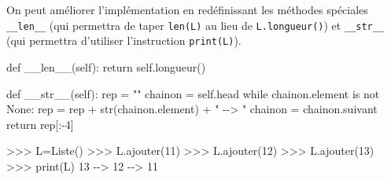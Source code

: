 \documentclass[
  a4paper,
  DIV=11,
  numbers=noendperiod]{scrartcl}
\newenvironment{Shaded}{\begin{snugshade}}{\end{snugshade}}
\newcommand{\BuiltInTok}[1]{\textcolor[rgb]{0.00,0.23,0.31}{#1}}
\newcommand{\ControlFlowTok}[1]{\textcolor[rgb]{0.00,0.23,0.31}{#1}}
\newcommand{\DecValTok}[1]{\textcolor[rgb]{0.68,0.00,0.00}{#1}}
\newcommand{\FunctionTok}[1]{\textcolor[rgb]{0.28,0.35,0.67}{#1}}
\newcommand{\KeywordTok}[1]{\textcolor[rgb]{0.00,0.23,0.31}{#1}}
\newcommand{\NormalTok}[1]{\textcolor[rgb]{0.00,0.23,0.31}{#1}}
\newcommand{\OperatorTok}[1]{\textcolor[rgb]{0.37,0.37,0.37}{#1}}
\newcommand{\StringTok}[1]{\textcolor[rgb]{0.13,0.47,0.30}{#1}}
\newcommand{\VariableTok}[1]{\textcolor[rgb]{0.07,0.07,0.07}{#1}}
\begin{document}
On peut améliorer l'implémentation en redéfinissant les méthodes
spéciales \texttt{\_\_len\_\_} (qui permettra de taper \texttt{len(L)}
au lieu de \texttt{L.longueur()}) et \texttt{\_\_str\_\_} (qui permettra
d'utiliser l'instruction \texttt{print(L)}).

\begin{Shaded}
\begin{Highlighting}[]
    \KeywordTok{def} \FunctionTok{\_\_len\_\_}\NormalTok{(}\VariableTok{self}\NormalTok{):}
        \ControlFlowTok{return} \VariableTok{self}\NormalTok{.longueur()}

    \KeywordTok{def} \FunctionTok{\_\_str\_\_}\NormalTok{(}\VariableTok{self}\NormalTok{):}
\NormalTok{        rep }\OperatorTok{=} \StringTok{""}
\NormalTok{        chainon }\OperatorTok{=} \VariableTok{self}\NormalTok{.head}
        \ControlFlowTok{while}\NormalTok{ chainon.element }\KeywordTok{is} \KeywordTok{not} \VariableTok{None}\NormalTok{:}
\NormalTok{            rep }\OperatorTok{=}\NormalTok{ rep }\OperatorTok{+} \BuiltInTok{str}\NormalTok{(chainon.element) }\OperatorTok{+} \StringTok{" {-}{-}\textgreater{} "}
\NormalTok{            chainon }\OperatorTok{=}\NormalTok{ chainon.suivant}
        \ControlFlowTok{return}\NormalTok{ rep[:}\OperatorTok{{-}}\DecValTok{4}\NormalTok{]}
\end{Highlighting}
\end{Shaded}

\begin{Shaded}
\begin{Highlighting}[]
\OperatorTok{\textgreater{}\textgreater{}\textgreater{}}\NormalTok{ L}\OperatorTok{=}\NormalTok{Liste()}
\OperatorTok{\textgreater{}\textgreater{}\textgreater{}}\NormalTok{ L.ajouter(}\DecValTok{11}\NormalTok{)}
\OperatorTok{\textgreater{}\textgreater{}\textgreater{}}\NormalTok{ L.ajouter(}\DecValTok{12}\NormalTok{)}
\OperatorTok{\textgreater{}\textgreater{}\textgreater{}}\NormalTok{ L.ajouter(}\DecValTok{13}\NormalTok{)}
\OperatorTok{\textgreater{}\textgreater{}\textgreater{}} \BuiltInTok{print}\NormalTok{(L)}
\DecValTok{13} \OperatorTok{{-}{-}\textgreater{}} \DecValTok{12} \OperatorTok{{-}{-}\textgreater{}} \DecValTok{11} 
\end{Highlighting}
\end{Shaded}
\end{document}

